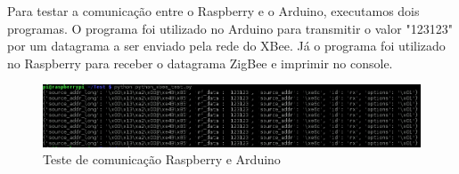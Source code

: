 Para testar a comunicação entre o Raspberry e o Arduino, executamos dois programas. O programa  foi utilizado no Arduino para transmitir o valor "123123" por um datagrama a ser enviado pela rede do XBee. Já o programa  foi utilizado no Raspberry para receber o datagrama ZigBee e imprimir no console.





\begin{figure}[H]
\centering
\includegraphics[width=1\textwidth]{figuras/raspberry_arduino_1.png}
\caption{\label{fig:raspberry_arduino_1} Teste de comunicação Raspberry e Arduino}
\end{figure}